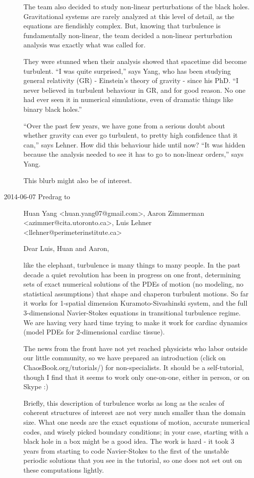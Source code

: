\begin{description}
The team also decided to study non-linear perturbations of the black
holes. Gravitational systems are rarely analyzed at this level of detail,
as the equations are fiendishly complex. But, knowing that turbulence is
fundamentally non-linear, the team decided a non-linear perturbation
analysis was exactly what was called for.

They were stunned when their analysis showed that spacetime did become
turbulent.
``I was quite surprised,'' says Yang, who has been studying general
relativity (GR) - Einstein's theory of gravity - since his PhD. ``I never
believed in turbulent behaviour in GR, and for good reason. No one had
ever seen it in numerical simulations, even of dramatic things like
binary black holes.''

``Over the past few years, we have gone from a serious doubt about
whether gravity can ever go turbulent, to pretty high confidence that it
can,'' says Lehner.
How did this behaviour hide until now? ``It was hidden because the
analysis needed to see it has to go to non-linear orders,'' says Yang.

This
{blurb} might also be of interest.

\item[2014-06-07 Predrag to]
Huan Yang <huan.yang07@gmail.com>,
Aaron Zimmerman <azimmer@cita.utoronto.ca>,
Luis Lehner <llehner@perimeterinstitute.ca>

Dear Luis, Huan and Aaron,

like the elephant, turbulence is many things to many people. In the past
decade a quiet revolution has been in progress on one front, determining
sets of exact numerical solutions of the PDEs of motion (no modeling, no
statistical assumptions) that shape and chaperon turbulent motions. So
far it works for 1-spatial dimension Kuramoto-Sivashinski system, and the
full 3-dimensional Navier-Stokes equations in transitional turbulence
regime. We are having very hard time trying to make it work for cardiac
dynamics (model PDEs for 2-dimensional cardiac tissue).

The news from the front have not yet reached physicists who labor outside
our little community, so we have prepared an introduction (click on
ChaosBook.org/tutorials/) for non-specialists. It should be a
self-tutorial, though I find that it seems to work only one-on-one,
either in person, or on Skype :)

Briefly, this description of turbulence works as long as the scales of
coherent structures of interest are not very much smaller than the domain
size. What one needs are the exact equations of motion, accurate
numerical codes, and wisely picked boundary conditions; in your case,
starting with a black hole in a box might be a good idea. The work is
hard - it took 3 years from starting to code Navier-Stokes to the first
of the unstable periodic solutions that you see in the tutorial, so one
does not set out on these computations lightly.


\end{description}
